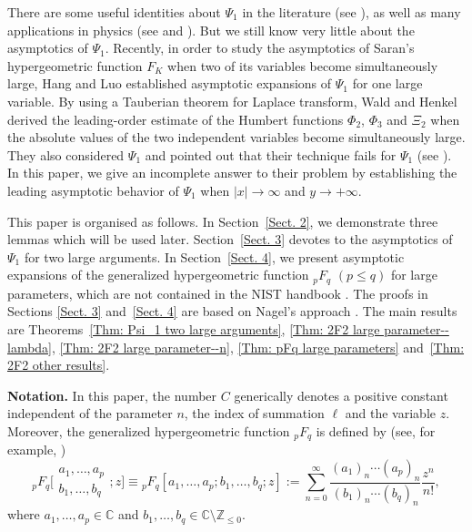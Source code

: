 \documentclass[pdftex]{sigma}
\numberwithin{equation}{section}
\newcommand{\CC}{\ensuremath{\mathbb{C}}}
\newcommand{\ZZ}{\ensuremath{\mathbb{Z}}}
\begin{document}
There are some useful identities about $\Psi_1$ in the literature (see \cite{Brychkov_Saad-2014,Choi_Hasanov-2011,ElHalba-2014,Humbert-1922}), as well as many applications in physics (see \cite[equation~(5.2)]{Ahbli_Mouayn-2018} and \cite{Belafhal_Saad-2017,Borghi-2023}). But we still know very little about the asymptotics of $\Psi_1$. Recently, in order to study the asymptotics of Saran's hypergeometric function $F_K$ when two of its variables become simultaneously large, Hang and Luo \cite{Hang_Luo-2024} established asymptotic expansions of $\Psi_1$ for one large variable. By using a Tauberian theorem for Laplace transform, Wald and Henkel \cite{Wald_Henkel-2018} derived the leading-order estimate of the Humbert functions $\Phi_2$, $\Phi_3$ and $\Xi_2$ when the absolute values of the two independent variables become simultaneously large. They also considered $\Psi_1$ and pointed out that their technique fails for $\Psi_1$ (see \cite[p.~99]{Wald_Henkel-2018}). In this paper, we give an incomplete answer to their problem by establishing the leading asymptotic behavior of $\Psi_1$ when $|x|\to \infty$ and $y\to +\infty$.

This paper is organised as follows. In Section~\ref{Sect. 2}, we demonstrate three lemmas which will be used later. Section~\ref{Sect. 3} devotes to the asymptotics of $\Psi_1$ for two large arguments. In Section~\ref{Sect. 4}, we present asymptotic expansions of the generalized hypergeometric function $_pF_q$ $(p\leqslant q)$ for large parameters, which are not contained in the NIST handbook \cite{NIST-Handbook}. The proofs in Sections \ref{Sect. 3} and~\ref{Sect. 4} are based on Nagel's approach \cite{Nagel-2004}. The main results are Theorems~\ref{Thm: Psi_1 two large arguments}, \ref{Thm: 2F2 large parameter--lambda}, \ref{Thm: 2F2 large parameter--n}, \ref{Thm: pFq large parameters} and~\ref{Thm: 2F2 other results}.

\textbf{Notation.}
In this paper, the number $C$ generically denotes a positive constant independent of the parameter $n$, the index of summation $\ell$ and the variable $z$. Moreover, the generalized hypergeometric function $_pF_q$ is defined by (see, for example, \cite[p.~404]{NIST-Handbook})
	\begin{equation}\label{pFq definition}
		{}_pF_q\bigg[\begin{matrix}
			a_1,\dots,a_p\\
			b_1,\dots,b_q
		\end{matrix};z\bigg]
		\equiv
		{}_pF_q[
		a_1,\dots,a_p;
		b_1,\dots,b_q;z]
		:=\sum_{n=0}^{\infty}\frac{(a_1)_n\cdots(a_p)_n}{(b_1)_n\cdots(b_q)_n}\frac{z^n}{n!},
	\end{equation}
	where $a_1,\dots,a_p\in\CC$ and $b_1,\dots,b_q\in\CC\setminus\ZZ_{\leqslant 0}$.
\end{document}
